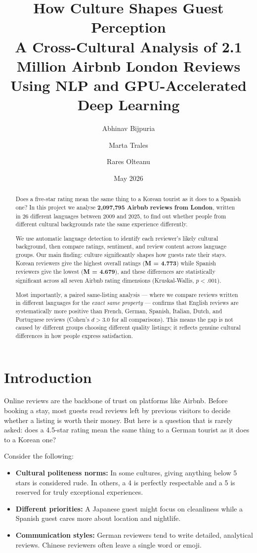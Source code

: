 \documentclass[12pt,a4paper]{article}
\title{\LARGE\textbf{How Culture Shapes Guest Perception}\\[0.5em]
\large A Cross-Cultural Analysis of 2.1 Million Airbnb London Reviews\\Using NLP and GPU-Accelerated Deep Learning}
\author{Abhinav Bijpuria \and Marta Trales \and Rares Olteanu}
\date{May 2026}
\begin{document}
\maketitle

\begin{abstract}
Does a five-star rating mean the same thing to a Korean tourist as it does to a Spanish one?
In this project we analyse \textbf{2,097,795 Airbnb reviews from London}, written in 26 different languages between 2009 and 2025, to find out whether people from different cultural backgrounds rate the same experience differently.

We use automatic language detection to identify each reviewer's likely cultural background, then compare ratings, sentiment, and review content across language groups.
Our main finding: culture significantly shapes how guests rate their stays.
Korean reviewers give the highest overall ratings (\textbf{M = 4.773}) while Spanish reviewers give the lowest (\textbf{M = 4.679}), and these differences are statistically significant across all seven Airbnb rating dimensions (Kruskal-Wallis, $p < .001$).

Most importantly, a paired same-listing analysis --- where we compare reviews written in different languages for the \emph{exact same property} --- confirms that English reviews are systematically more positive than French, German, Spanish, Italian, Dutch, and Portuguese reviews (Cohen's $d > 3.0$ for all comparisons).
This means the gap is not caused by different groups choosing different quality listings; it reflects genuine cultural differences in how people express satisfaction.
\end{abstract}

\section{Introduction}

Online reviews are the backbone of trust on platforms like Airbnb.
Before booking a stay, most guests read reviews left by previous visitors to decide whether a listing is worth their money.
But here is a question that is rarely asked: does a 4.5-star rating mean the same thing to a German tourist as it does to a Korean one?

Consider the following:
\begin{itemize}[nosep]
    \item \textbf{Cultural politeness norms:} In some cultures, giving anything below 5 stars is considered rude. In others, a 4 is perfectly respectable and a 5 is reserved for truly exceptional experiences.
    \item \textbf{Different priorities:} A Japanese guest might focus on cleanliness while a Spanish guest cares more about location and nightlife.
    \item \textbf{Communication styles:} German reviewers tend to write detailed, analytical reviews. Chinese reviewers often leave a single word or emoji.
\end{itemize}
\end{document}
